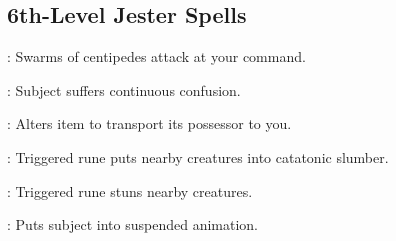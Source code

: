 \begin{multicols}{2}
\subsection{6th-Level Jester Spells}
\begin{description*}
\item[\linkspell{Creeping Doom}:] Swarms of centipedes attack at your command.
\item[\linkspell{Insanity}:] Subject suffers continuous confusion.
\item[\linkspell{Refuge}:] Alters item to transport its possessor to you.
\item[\linkspell{Symbol of Sleep}:] Triggered rune puts nearby creatures into catatonic slumber.
\item[\linkspell{Symbol of Stunning}:] Triggered rune stuns nearby creatures.
\item[\linkspell{Temporal Stasis}:] Puts subject into suspended animation.
\end{description*}

\end{multicols}